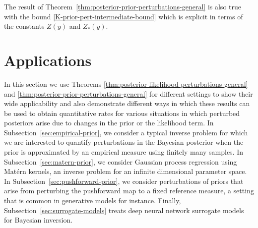 \documentclass[final]{siamart171218}
\newcommand{\bhtodo}[1]{\todo[linecolor=red,backgroundcolor=red!25,bordercolor=red]{#1}}
\newcommand{\mcl}{\mathcal}
\newcommand{\mbb}{\mathbb}
\newcommand{\mX}{\mcl{X}}
\newcommand{\mY}{\mcl{Y}}
\newcommand{\cc}{c}
\newcommand{\K}{\mathcal{D}}
\begin{document}
\begin{corollary}\label{cor:posterior-prior-perturbations-general}
          The result of Theorem~\ref{thm:posterior-prior-perturbations-general} is also 
        true with the bound \eqref{K-prior-pert-intermediate-bound} which is 
        explicit in terms of the constants $Z(y)$ and $Z_\ast(y)$.
\end{corollary}



\section{Applications}\label{sec:applications}

In this section we use Theorems \ref{thm:posterior-likelihood-perturbations-general} and
\ref{thm:posterior-prior-perturbations-general} for different settings to show
their wide applicability and also demonstrate different ways in which these results
can be used to obtain quantitative rates for various situations in which perturbed posteriors
arise due to changes in the prior or the likelihood term. In Subsection~\ref{sec:empirical-prior}, we consider a typical inverse problem for which we are interested to quantify perturbations in the Bayesian posterior when the prior is approximated by an empirical measure using finitely many samples. In Subsection~\ref{sec:matern-prior}, we consider Gaussian process regression using Mat\'ern kernels, an inverse problem for an infinite dimensional parameter space. In Subsection~\ref{sec:pushforward-prior}, we consider perturbations of priors that arise from perturbing the pushforward map to a fixed reference measure, a setting that is common in generative models for instance. Finally, Subsection~\ref{sec:surrogate-models} treats deep neural network surrogate models for Bayesian inversion.
\end{document}
